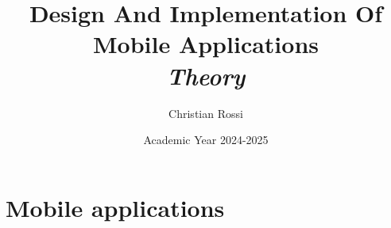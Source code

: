 \documentclass[12pt, a4paper]{report}
\title{Design And Implementation Of Mobile Applications \\ \textit{Theory}}
\author{Christian Rossi}
\date{Academic Year 2024-2025}
\begin{document}
    \maketitle

    

    \cleardoublepage

    \tableofcontents

    \cleardoublepage

    \chapter{Mobile applications}
    
\end{document}
